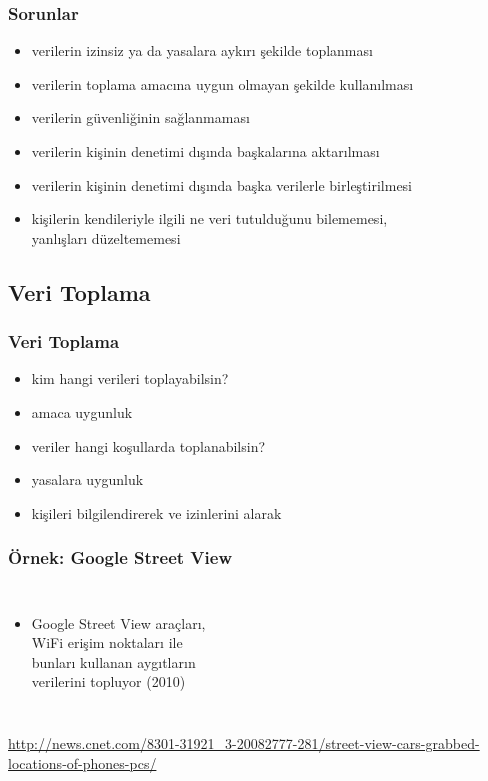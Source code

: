 \documentclass[dvipsnames]{beamer}
\theoremstyle{plain}
\begin{document}
\begin{frame}
  \frametitle{Sorunlar}

  \begin{itemize}
    \item verilerin izinsiz ya da yasalara aykırı şekilde toplanması
    \item verilerin toplama amacına uygun olmayan şekilde kullanılması
    \item verilerin güvenliğinin sağlanmaması
    \item verilerin kişinin denetimi dışında başkalarına aktarılması
    \item verilerin kişinin denetimi dışında başka verilerle birleştirilmesi
    \item kişilerin kendileriyle ilgili ne veri tutulduğunu bilememesi,\\
      yanlışları düzeltememesi
  \end{itemize}
\end{frame}

\subsection{Veri Toplama}

\begin{frame}
  \frametitle{Veri Toplama}

  \begin{itemize}
    \item kim hangi verileri toplayabilsin?
    \item amaca uygunluk

    \pause
    \bigskip
    \item veriler hangi koşullarda toplanabilsin?
    \item yasalara uygunluk
    \item kişileri bilgilendirerek ve izinlerini alarak
  \end{itemize}
\end{frame}

\begin{frame}
  \frametitle{Örnek: Google Street View}

  \begin{columns}

    \begin{itemize}
      \item Google Street View araçları,\\
        WiFi erişim noktaları ile\\
        bunları kullanan aygıtların\\
        verilerini topluyor (2010)
    \end{itemize}
  \end{columns}

  \medskip
  \tiny{\url{http://news.cnet.com/8301-31921_3-20082777-281/street-view-cars-grabbed-locations-of-phones-pcs/}}\\
\end{frame}
\end{document}
